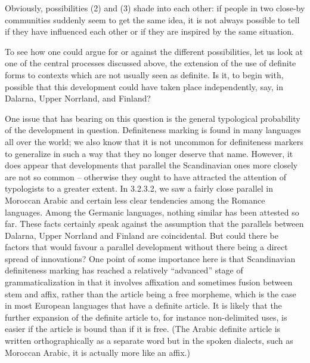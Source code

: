 
Obviously, possibilities (2) and (3) shade into each other: if people in two close-by communities suddenly seem to get the same idea, it is not always possible to tell if they have influenced each other or if they are inspired by the same situation. 


To see how one could argue for or against the different possibilities, let us look at one of the central processes discussed above, the extension of the use of definite forms to contexts which are not usually seen as definite. Is it, to begin with, possible that this development could have taken place independently, say, in Dalarna, Upper Norrland, and Finland? 


One issue that has bearing on this question is the general typological probability of the development in question. Definiteness marking is found in many languages all over the world; we also know that it is not uncommon for definiteness markers to generalize in such a way that they no longer deserve that name. However, it does appear that developments that parallel the Scandinavian ones more closely are not so common – otherwise they ought to have attracted the attention of typologists to a greater extent. In 3.2.3.2, we saw a fairly close parallel in Moroccan Arabic and certain less clear tendencies among the Romance languages. Among the Germanic languages, nothing similar has been attested so far. These facts certainly speak against the assumption that the parallels between Dalarna, Upper Norrland and Finland are coincidental. But could there be factors that would favour a parallel development without there being a direct spread of innovations? One point of some importance here is that Scandinavian definiteness marking has reached a relatively “advanced” stage of grammaticalization in that it involves affixation and sometimes fusion between stem and affix, rather than the article being a free morpheme, which is the case in most European languages that have a definite article. It is likely that the further expansion of the definite article to, for instance non-delimited uses, is easier if the article is bound than if it is free. (The Arabic definite article is written orthographically as a separate word but in the spoken dialects, such as Moroccan Arabic, it is actually more like an affix.) 


